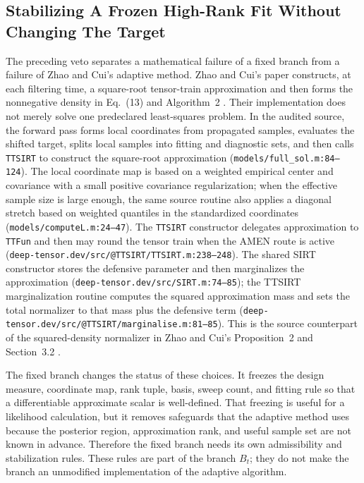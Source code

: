 \documentclass[11pt]{article}
\numberwithin{equation}{section}
\begin{document}
\subsection*{Stabilizing A Frozen High-Rank Fit Without Changing The Target}

The preceding veto separates a mathematical failure of a fixed branch from a
failure of Zhao and Cui's adaptive method.  Zhao and Cui's paper constructs, at
each filtering time, a square-root tensor-train approximation and then forms the
nonnegative density in Eq.~(13) and Algorithm~2
\cite{zhao2024ttsequential}.  Their implementation does not merely solve one
predeclared least-squares problem.  In the audited source, the forward pass
forms local coordinates from propagated samples, evaluates the shifted target,
splits local samples into fitting and diagnostic sets, and then calls
\texttt{TTSIRT} to construct the square-root approximation
(\texttt{models/full\_sol.m:84--124}).  The local coordinate map is based on a
weighted empirical center and covariance with a small positive covariance
regularization; when the effective sample size is large enough, the same source
routine also applies a diagonal stretch based on weighted quantiles in the
standardized coordinates (\texttt{models/computeL.m:24--47}).  The
\texttt{TTSIRT} constructor delegates approximation to \texttt{TTFun} and then
may round the tensor train when the AMEN route is active
(\texttt{deep-tensor.dev/src/@TTSIRT/TTSIRT.m:238--248}).  The shared SIRT
constructor stores the defensive parameter and then marginalizes the
approximation (\texttt{deep-tensor.dev/src/SIRT.m:74--85}); the TTSIRT
marginalization routine computes the squared approximation mass and sets the
total normalizer to that mass plus the defensive term
(\texttt{deep-tensor.dev/src/@TTSIRT/marginalise.m:81--85}).  This is the source
counterpart of the squared-density normalizer in Zhao and Cui's Proposition~2
and Section~3.2 \cite{zhao2024ttsequential}.

The fixed branch changes the status of these choices.  It freezes the design
measure, coordinate map, rank tuple, basis, sweep count, and fitting rule so
that a differentiable approximate scalar is well-defined.  That freezing is
useful for a likelihood calculation, but it removes safeguards that the
adaptive method uses because the posterior region, approximation rank, and
useful sample set are not known in advance.  Therefore the fixed branch needs
its own admissibility and stabilization rules.  These rules are part of the
branch \(B_t\); they do not make the branch an unmodified implementation of the
adaptive algorithm.
\end{document}
